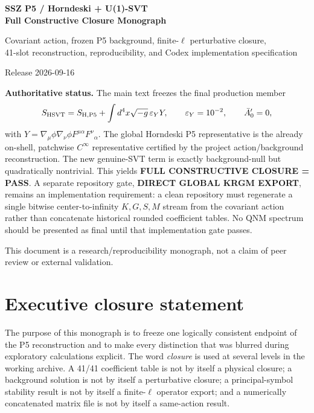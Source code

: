 \documentclass[11pt,a4paper,oneside]{book}
\newcommand{\epsY}{\varepsilon_Y}
\begin{document}
\frontmatter
\begin{titlepage}\centering
\vspace*{18mm}
{\Huge\bfseries SSZ P5 / Horndeski + U(1)-SVT\\[3mm]Full Constructive Closure Monograph\par}
\vspace{8mm}
{\Large Covariant action, frozen P5 background, finite-$\ell$ perturbative closure,\\41-slot reconstruction, reproducibility, and Codex implementation specification\par}
\vspace{12mm}
{\large Release 2026-09-16\par}
\vfill
\begin{minipage}{0.88\textwidth}\small
\textbf{Authoritative status.} The main text freezes the final production member
\[
S_{\rm HSVT}=S_{\rm H,P5}+\int d^4x\sqrt{-g}\,\epsY Y,\qquad \epsY=10^{-2},\qquad \bar A_0'=0,
\]
with $Y=\nabla_\mu\phi\nabla_\nu\phi F^{\mu\alpha}F^{\nu}{}_{\alpha}$. The global Horndeski P5 representative is the already on-shell, patchwise $C^\infty$ representative certified by the project action/background reconstruction. The new genuine-SVT term is exactly background-null but quadratically nontrivial. This yields \textbf{FULL CONSTRUCTIVE CLOSURE = PASS}. A separate repository gate, \textbf{DIRECT GLOBAL KRGM EXPORT}, remains an implementation requirement: a clean repository must regenerate a single bitwise center-to-infinity $K,G,S,M$ stream from the covariant action rather than concatenate historical rounded coefficient tables. No QNM spectrum should be presented as final until that implementation gate passes.
\end{minipage}
\vfill
{\small This document is a research/reproducibility monograph, not a claim of peer review or external validation.}
\end{titlepage}
\tableofcontents
\listoffigures
\listoftables
\mainmatter
\chapter{Executive closure statement}
The purpose of this monograph is to freeze one logically consistent endpoint of the P5 reconstruction and to make every distinction that was blurred during exploratory calculations explicit. The word \emph{closure} is used at several levels in the working archive. A 41/41 coefficient table is not by itself a physical closure; a background solution is not by itself a perturbative closure; a principal-symbol stability result is not by itself a finite-$\ell$ operator export; and a numerically concatenated matrix file is not by itself a same-action result.
\end{document}
